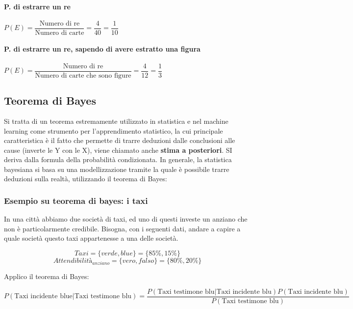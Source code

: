 \documentclass[\main/main.tex]{subfiles}
\begin{document}
\paragraph{P. di estrarre un re} $P(E) = \dfrac{\text{Numero di re}}{\text{Numero di carte}} = \dfrac{4}{40} = \dfrac{1}{10}$
\paragraph{P. di estrarre un re, sapendo di avere estratto una figura} $P(E) = \dfrac{\text{Numero di re}}{\text{Numero di carte che sono figure}} = \dfrac{4}{12} = \dfrac{1}{3}$

\subsection{Teorema di Bayes}
Si tratta di un teorema estremamente utilizzato in statistica e nel machine learning come strumento per l'apprendimento statistico, la cui principale caratteristica è il fatto che permette di trarre deduzioni dalle conclusioni alle cause (inverte le Y con le X), viene chiamato anche \textbf{stima a posteriori}. SI deriva dalla formula della probabilità condizionata. In generale, la statistica bayesiana si basa su una modellizzazione tramite la quale è possibile trarre deduzioni sulla realtà, utilizzando il teorema di Bayes:

\bayesTh

\subsubsection{Esempio su teorema di bayes: i taxi}
In una città abbiamo due società di taxi, ed uno di questi investe un anziano che non è particolarmente credibile. Bisogna, con i seguenti dati, andare a capire a quale società questo taxi appartenesse a una delle società.

\[
  Taxi = \{ verde, blue \} = \{85\%, 15\%\}
\]
\[
  Attendibilità_{anziano} = \{vero, falso\} = \{80 \%, 20\% \}
\]

Applico il teorema di Bayes:

\[
  P(\text{Taxi incidente blue} | \text{Taxi testimone blu}) = \dfrac{P(\text{Taxi testimone blu}| \text{Taxi incidente blu})P(\text{Taxi incidente blu})}{P(\text{Taxi testimone blu})}
\]
\end{document}
